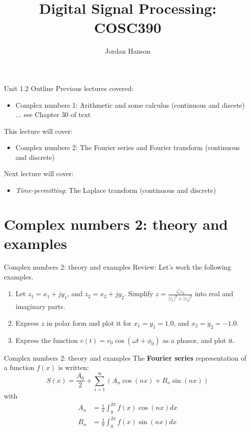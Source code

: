 \documentclass{beamer}
\title{Digital Signal Processing: COSC390}
\author{Jordan Hanson}
\institute{Whittier College Department of Physics and Astronomy}
\begin{document}
\maketitle

\begin{frame}{Unit 1.2 Outline}
Previous lectures covered:
\begin{itemize}
\item Complex numbers 1: Arithmetic and some calculus (continuous and discete) ... see Chapter 30 of text
\end{itemize}
This lecture will cover:
\begin{itemize}
\item \alert{Complex numbers 2: The Fourier series and Fourier transform (continuous and discrete)}
\end{itemize}
Next lecture will cover:
\begin{itemize}
\item \textit{Time-permitting}: The Laplace transform (continuous and discrete)
\end{itemize}
\end{frame}

\section{Complex numbers 2: theory and examples}

\begin{frame}{Complex numbers 2: theory and examples}
Review: Let's work the following examples.
\begin{enumerate}
\item Let $z_1 = x_1 + j y_1$, and $z_2 = x_2 + j y_2$.  Simplify $z = \frac{z_1^* z_2}{|z_1|^2 + |z_2|^2}$ into real and imaginary parts.
\item Express $z$ in polar form and plot it for $x_1 = y_1 = 1.0$, and $x_2 = y_2 = -1.0$.
\item Express the function $v(t) = v_0 \cos(\omega t + \phi_0)$ as a phasor, and plot it.
\end{enumerate}
\end{frame}

\begin{frame}{Complex numbers 2: theory and examples}
The \alert{\textbf{Fourier series}} representation of a function $f(x)$ is written:
\begin{equation}
S(x) = \frac{A_0}{2}+\sum_{i=1}^{\infty} \left( A_n \cos(nx) + B_n \sin(nx) \right)
\end{equation}
with
\begin{align}
A_n &= \frac{1}{\pi} \int_0^{2\pi} f(x) \cos(nx) dx \\
B_n &= \frac{1}{\pi} \int_0^{2\pi} f(x) \sin(nx) dx
\end{align}
\end{frame}
\end{document}
